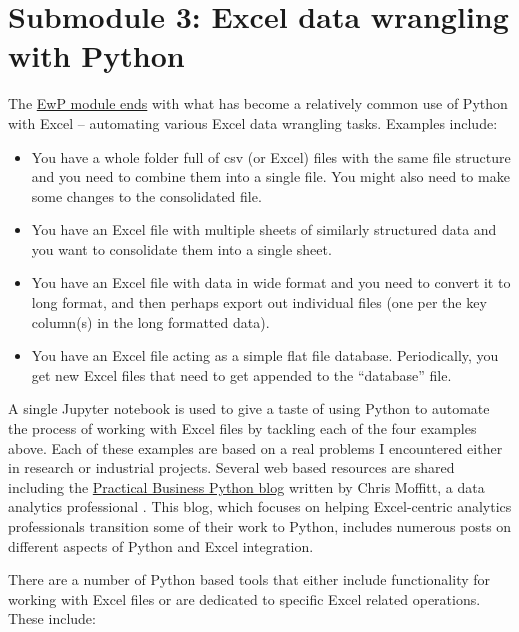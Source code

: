 \documentclass[ited,blindrev]{informs3}              %
\begin{document}
\section{Submodule 3: Excel data wrangling with Python}

The \href{http://www.sba.oakland.edu/faculty/isken/courses/aap/mod3c_python_excel.html}{EwP module ends} with what has become a relatively common use of Python with Excel -- automating various Excel data wrangling tasks. Examples include:

\begin{itemize}
	\item
	You have a whole folder full of csv (or Excel) files with the same
	file structure and you need to combine them into a single file. You
	might also need to make some changes to the consolidated file.
	\item
	You have an Excel file with multiple sheets of similarly structured
	data and you want to consolidate them into a single sheet.
	\item
	You have an Excel file with data in wide format and you need to
	convert it to long format, and then perhaps export out individual
	files (one per the key column(s) in the long formatted data).
	\item
	You have an Excel file acting as a simple flat file database.
	Periodically, you get new Excel files that need to get appended to the
	``database'' file.
\end{itemize}

A single Jupyter notebook is used to give a taste of using Python to automate the process of working with Excel files by tackling each of the four examples above. Each of these examples are based on a real problems I encountered either in research or industrial projects. Several web based resources are shared including the \href{https://pbpython.com/}{Practical Business Python blog} written by Chris Moffitt, a data analytics professional \cite{moffittPracticalBusinessPython2022}. This blog, which focuses on helping Excel-centric analytics professionals transition some of their work to Python, includes numerous posts on different aspects of Python and Excel integration.  

There are a number of Python based tools that either include functionality for working with Excel files or are dedicated to specific Excel related operations. These include:
\end{document}
